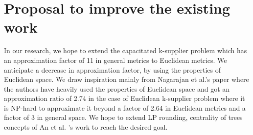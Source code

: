 \documentclass[12pt, a4paper]{article}
\begin{document}
\section{Proposal to improve the existing work}
In our research, we hope to extend the capacitated k-supplier problem which has an approximation factor of 11 in general metrics to Euclidean metrics. We anticipate a decrease in approximation factor, by using the properties of Euclidean space. We draw inspiration mainly from Nagarajan et al.'s\cite{EuclideanKS}  paper where the authors have heavily used the properties of Euclidean space and got an approximation ratio of 2.74 in the case of Euclidean k-supplier problem where it is NP-hard to approximate it beyond a factor of 2.64 in Euclidean metrics and a factor of 3 in general space. We hope to extend LP rounding, centrality of trees concepts of An et al. 's\cite{capKCcentrality} work to reach the desired goal.
\end{document}
